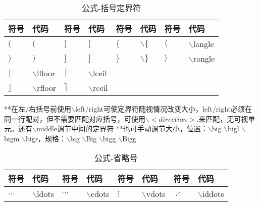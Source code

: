\documentclass[UTF8,fontset=ubuntu]{ctexart}
\begin{document}
\begin{table}
\begin{tabular}{l l l l l l l l}
	\hline
	符号 & 代码 & 符号 & 代码 & 符号 & 代码 & 符号 & 代码\\
	\hline
	$($ & $($ & $[$ & $[$ & $\{$ & $\backslash\{$ & $\langle$ & $\backslash$langle\\
	$)$ & $)$ & $]$ & $]$ & $\}$ & $\backslash\}$ & $\rangle$ & $\backslash$rangle\\
	$\lfloor$ & $\backslash$lfloor & $\lceil$ & $\backslash$lceil\\
	$\rfloor$ & $\backslash$rfloor & $\rceil$ & $\backslash$rceil\\
\end{tabular}\par
**在左/右括号前使用$\backslash$left/right可使定界符随视情况改变大小，left/right必须在同一行配对，但不需要匹配对应括号，可使用$\backslash<direction>$.来匹配，无可视单元。还有$\backslash$middle调节中间的定界符
**也可手动调节大小，位置：$\backslash$big $\backslash$bigl $\backslash$bigm $\backslash$bigr，规格：$\backslash$big $\backslash$Big $\backslash$bigg $\backslash$Bigg
\caption{公式-括号定界符}
\end{table}
\begin{table}
\begin{tabular}{l l l l l l l l}
	\hline
	符号 & 代码 & 符号 & 代码 & 符号 & 代码 & 符号 & 代码\\
	\hline
	$\ldots$ & $\backslash$ldots & $\cdots$ & $\backslash$cdots & $\vdots$ & $\backslash$vdots & $\iddots$ & $\backslash$iddots\\
\end{tabular}
\caption{公式-省略号}
\end{table}
\end{document}
